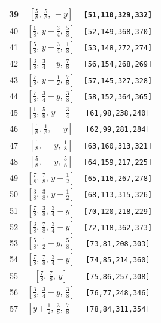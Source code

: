 \documentclass[fleqn,8pt]{jsarticle}
\begin{document}
\begin{longtable}{ccc}
39 & $\left[ \frac{5}{8},\, \frac{5}{8},\, - y \right]$ & {\tt [51,110,329,332]} \\ \hline
40 & $\left[ \frac{1}{8},\, y + \frac{3}{4},\, \frac{5}{8} \right]$ & {\tt [52,149,368,370]} \\ \hline
41 & $\left[ \frac{5}{8},\, y + \frac{3}{4},\, \frac{1}{8} \right]$ & {\tt [53,148,272,274]} \\ \hline
42 & $\left[ \frac{3}{8},\, \frac{3}{4} - y,\, \frac{7}{8} \right]$ & {\tt [56,154,268,269]} \\ \hline
43 & $\left[ \frac{7}{8},\, y + \frac{1}{2},\, \frac{7}{8} \right]$ & {\tt [57,145,327,328]} \\ \hline
44 & $\left[ \frac{7}{8},\, \frac{3}{4} - y,\, \frac{3}{8} \right]$ & {\tt [58,152,364,365]} \\ \hline
45 & $\left[ \frac{1}{8},\, \frac{5}{8},\, y + \frac{3}{4} \right]$ & {\tt [61,98,238,240]} \\ \hline
46 & $\left[ \frac{1}{8},\, \frac{1}{8},\, - y \right]$ & {\tt [62,99,281,284]} \\ \hline
47 & $\left[ \frac{1}{8},\, - y,\, \frac{1}{8} \right]$ & {\tt [63,160,313,321]} \\ \hline
48 & $\left[ \frac{5}{8},\, - y,\, \frac{5}{8} \right]$ & {\tt [64,159,217,225]} \\ \hline
49 & $\left[ \frac{7}{8},\, \frac{7}{8},\, y + \frac{1}{2} \right]$ & {\tt [65,116,267,278]} \\ \hline
50 & $\left[ \frac{3}{8},\, \frac{3}{8},\, y + \frac{1}{2} \right]$ & {\tt [68,113,315,326]} \\ \hline
51 & $\left[ \frac{7}{8},\, \frac{3}{8},\, \frac{3}{4} - y \right]$ & {\tt [70,120,218,229]} \\ \hline
52 & $\left[ \frac{3}{8},\, \frac{7}{8},\, \frac{3}{4} - y \right]$ & {\tt [72,118,362,373]} \\ \hline
53 & $\left[ \frac{5}{8},\, \frac{1}{2} - y,\, \frac{5}{8} \right]$ & {\tt [73,81,208,303]} \\ \hline
54 & $\left[ \frac{7}{8},\, \frac{7}{8},\, \frac{3}{4} - y \right]$ & {\tt [74,85,214,360]} \\ \hline
55 & $\left[ \frac{7}{8},\, \frac{7}{8},\, y \right]$ & {\tt [75,86,257,308]} \\ \hline
56 & $\left[ \frac{3}{8},\, \frac{3}{4} - y,\, \frac{3}{8} \right]$ & {\tt [76,77,248,346]} \\ \hline
57 & $\left[ y + \frac{1}{2},\, \frac{3}{8},\, \frac{7}{8} \right]$ & {\tt [78,84,311,354]} \\ \hline

\end{longtable}
\end{document}
